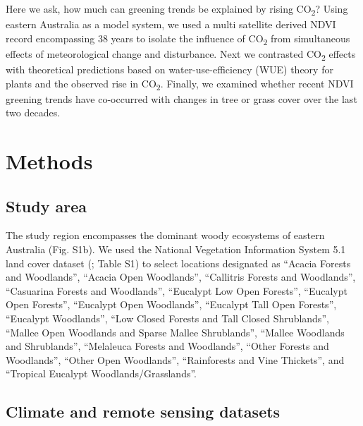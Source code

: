 \documentclass[gc, manuscript]{copernicus}
\begin{document}
Here we ask, how much can greening trends be explained by rising
CO\textsubscript{2}? Using eastern Australia as a model system, we used
a multi satellite derived NDVI record encompassing 38 years to isolate
the influence of CO\textsubscript{2} from simultaneous effects of
meteorological change and disturbance. Next we contrasted
CO\textsubscript{2} effects with theoretical predictions based on
water-use-efficiency (WUE) theory for plants and the observed rise in
CO\textsubscript{2}. Finally, we examined whether recent NDVI greening
trends have co-occurred with changes in tree or grass cover over the
last two decades.

\section{Methods}

\subsection{Study area}

The study region encompasses the dominant woody ecosystems of eastern
Australia (Fig. S1b). We used the National Vegetation Information System
5.1 land cover dataset (\citet{DepartmentAgricultureWater}; Table S1) to
select locations designated as ``Acacia Forests and Woodlands'',
``Acacia Open Woodlands'', ``Callitris Forests and Woodlands'',
``Casuarina Forests and Woodlands'', ``Eucalypt Low Open Forests'',
``Eucalypt Open Forests'', ``Eucalypt Open Woodlands'', ``Eucalypt Tall
Open Forests'', ``Eucalypt Woodlands'', ``Low Closed Forests and Tall
Closed Shrublands'', ``Mallee Open Woodlands and Sparse Mallee
Shrublands'', ``Mallee Woodlands and Shrublands'', ``Melaleuca Forests
and Woodlands'', ``Other Forests and Woodlands'', ``Other Open
Woodlands'', ``Rainforests and Vine Thickets'', and ``Tropical Eucalypt
Woodlands/Grasslands''.

\subsection{Climate and remote sensing datasets}
\end{document}
